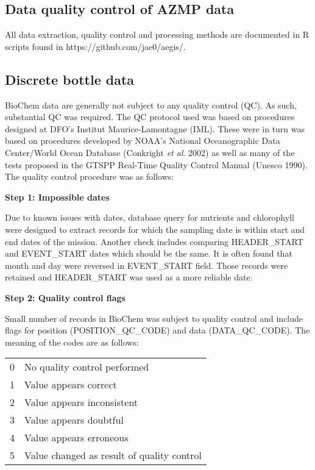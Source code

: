 \documentclass[letterpaper,portrait,11pt]{scrartcl}
\numberwithin{equation}{section}    %
\numberwithin{figure}{section}    %
\numberwithin{table}{section}       %
\begin{document}
\clearpage
\begin{appendices}

\section{Data quality control of AZMP data}

All data extraction, quality control and processing methods are documented in R scripts found in https://github.com/jae0/aegis/.

\subsection{Discrete bottle data}

BioChem data are generally not subject to any quality control (QC). As such, substantial QC was required. The QC protocol used was based on procedures designed at DFO's Institut Maurice-Lamontagne (IML). These were in turn was based on procedures developed by NOAA's National Oceanographic Data Center/World Ocean Database (Conkright \textit{et al}. 2002) as well as many of the tests proposed in the GTSPP Real-Time Quality Control Manual (Unesco 1990). The quality control procedure was as follows:

\textbf{Step 1: Impossible dates}

Due to known issues with dates, database query for nutrients and chlorophyll were designed to extract records for which the sampling date is within start and end dates of the mission. Another check includes comparing HEADER\_START and EVENT\_START dates which should be the same. It is often found that month and day were reversed in EVENT\_START field. Those records were retained and HEADER\_START was used as a more reliable date.

\textbf{Step 2: Quality control flags}

Small number of records in BioChem was subject to quality control and  include flags for position (POSITION\_QC\_CODE) and data (DATA\_QC\_CODE). The meaning of the codes are as follows:

\begin{table} [h]
\begin{tabular}{ll}
0 & No quality control performed \\
1 & Value appears correct \\
2 & Value appears inconsistent \\
3 & Value appears doubtful \\
4 & Value  appears erroneous \\
5 & Value changed as result of quality control \\
\end{tabular}
\end{table}


\end{appendices}
\end{document}
